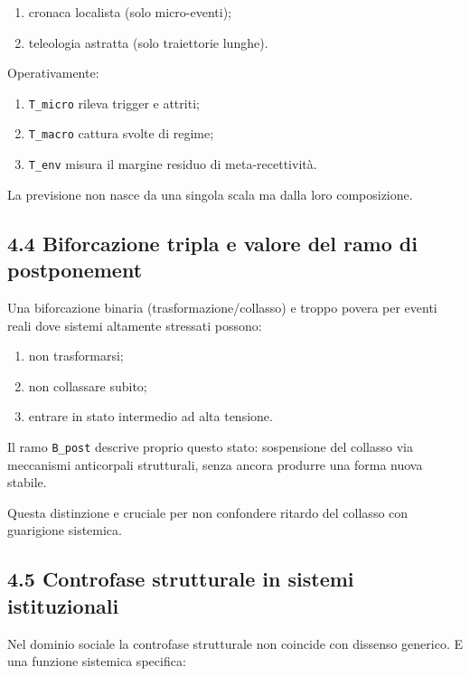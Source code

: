 \begin{enumerate}
\def\labelenumi{\arabic{enumi}.}
\tightlist
\item
  cronaca localista (solo micro-eventi);
\item
  teleologia astratta (solo traiettorie lunghe).
\end{enumerate}

Operativamente:

\begin{enumerate}
\def\labelenumi{\arabic{enumi}.}
\tightlist
\item
  \texttt{T\_micro} rileva trigger e attriti;
\item
  \texttt{T\_macro} cattura svolte di regime;
\item
  \texttt{T\_env} misura il margine residuo di meta-recettività.
\end{enumerate}

La previsione non nasce da una singola scala ma dalla loro composizione.

\subsection{4.4 Biforcazione tripla e valore del ramo di postponement}

Una biforcazione binaria (trasformazione/collasso) e troppo povera per eventi reali dove sistemi altamente stressati possono:

\begin{enumerate}
\def\labelenumi{\arabic{enumi}.}
\tightlist
\item
  non trasformarsi;
\item
  non collassare subito;
\item
  entrare in stato intermedio ad alta tensione.
\end{enumerate}

Il ramo \texttt{B\_post} descrive proprio questo stato: sospensione del collasso via meccanismi anticorpali strutturali, senza ancora produrre una forma nuova stabile.

Questa distinzione e cruciale per non confondere ritardo del collasso con guarigione sistemica.

\subsection{4.5 Controfase strutturale in sistemi istituzionali}

Nel dominio sociale la controfase strutturale non coincide con dissenso generico. E una funzione sistemica specifica:

